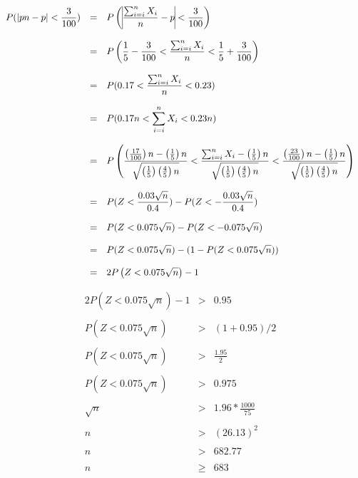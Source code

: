 \documentclass[10pt]{article}
\begin{document}
	\begin{equation*}
		\begin{array}{rcl}
			\displaystyle P(\vert pn - p \vert < \frac{3}{100})&= & \displaystyle P\left( \vline \frac{\sum_{i=i}^{n}X_i}{n} - p  \vline  < \frac{3}{100}\right)
			\\
			\\
			&=& \displaystyle P\left(\frac{1}{5}-\frac{3}{100}<\frac{\sum_{i=i}^{n}X_i}{n}<\frac{1}{5}+\frac{3}{100}\right)
			\\
			\\
			&=&\displaystyle P(0.17<\frac{\sum_{i=i}^{n}X_i}{n}<0.23)
			\\
			\\
			&=&\displaystyle P(0.17n<\sum_{i=i}^{n}X_i <0.23n)
			\\
			\\
			&=& \displaystyle P\left(\frac{\left(\frac{17}{100}\right)n-\left(\frac{1}{5}\right)n}{\sqrt{\left(\frac{1}{5}\right)\left(\frac{4}{5}\right)n}}<\frac{\sum_{i=i}^{n}X_i-\left(\frac{1}{5}\right)n}{\sqrt{\left(\frac{1}{5}\right)\left(\frac{4}{5}\right)n}}<\frac{\left(\frac{23}{100}\right)n-\left(\frac{1}{5}\right)n}{\sqrt{\left(\frac{1}{5}\right)\left(\frac{4}{5}\right)n}}\right)
			\\
			\\
			&=&\displaystyle P(Z<\frac{0.03\sqrt{n}}{0.4})-P(Z<-\frac{0.03\sqrt{n}}{0.4})
			\\
			\\
			&=&\displaystyle P(Z<0.075\sqrt{n})-P(Z<-0.075\sqrt{n})
			\\
			\\
			&=&\displaystyle P(Z<0.075\sqrt{n})-(1-P(Z< 0.075\sqrt{n}))
			\\
			\\
			&=&2 \displaystyle P \left(Z<0.075\sqrt{n}\right)-1
		\end{array}
	\end{equation*}


	\begin{equation*}
		\begin{array}{rcl}
			2P(Z<0.075\sqrt{n})-1 &> &0.95
			\\
			\\
			P(Z<0.075\sqrt{n})&>&(1+0.95)/2
			\\
			\\
			P(Z<0.075\sqrt{n})&>&\frac{1.95}{2}
			\\
			\\
			P(Z<0.075\sqrt{n})&>&0.975
			\\
			\\
			\sqrt{n}&>&1.96*\frac{1000}{75}
			\\
			\\
			n&>&(26.13)^2
			\\
			\\
			n&>&682.77
			\\
			\\
			n&\geq & 683
		\end{array}
	\end{equation*}
\end{document}
